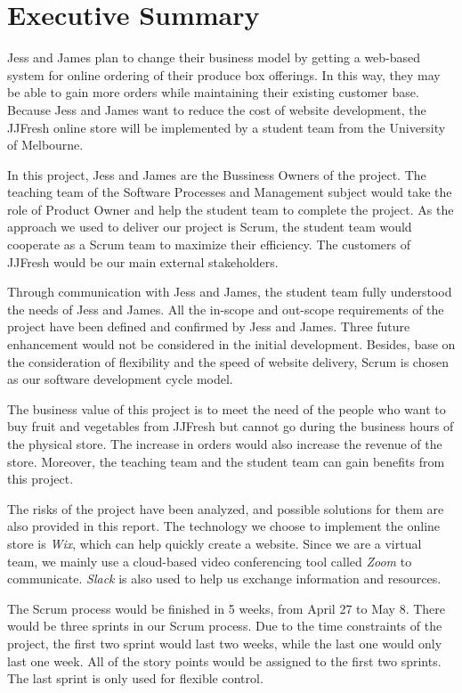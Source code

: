 \documentclass{report}
\begin{document}
\chapter*{Executive Summary}
   Jess and James plan to change their business model by getting a web-based system for online ordering of their produce box offerings. In this way, they may be able to gain more orders while maintaining their existing customer base. Because Jess and James want to reduce the cost of website development, the JJFresh online store will be implemented by a student team from the University of Melbourne.

   In this project, Jess and James are the Bussiness Owners of the project. The teaching team of the Software Processes and Management subject would take the role of Product Owner and help the student team to complete the project. As the approach we used to deliver our project is Scrum, the student team would cooperate as a Scrum team to maximize their efficiency. The customers of JJFresh would be our main external stakeholders.

   Through communication with Jess and James, the student team fully understood the needs of Jess and James. All the in-scope and out-scope requirements of the project have been defined and confirmed by Jess and James. Three future enhancement would not be considered in the initial development. Besides, base on the consideration of flexibility and the speed of website delivery, Scrum is chosen as our software development cycle model.

   The business value of this project is to meet the need of the people who want to buy fruit and vegetables from JJFresh but cannot go during the business hours of the physical store. The increase in orders would also increase the revenue of the store. Moreover, the teaching team and the student team can gain benefits from this project.

   The risks of the project have been analyzed, and possible solutions for them are also provided in this report. The technology we choose to implement the online store is \textit{Wix}, which can help quickly create a website. Since we are a virtual team, we mainly use a cloud-based video conferencing tool called \textit{Zoom} to communicate. \textit{Slack} is also used to help us exchange information and resources.

   The Scrum process would be finished in 5 weeks, from April 27 to May 8. There would be three sprints in our Scrum process. Due to the time constraints of the project, the first two sprint would last two weeks, while the last one would only last one week. All of the story points would be assigned to the first two sprints. The last sprint is only used for flexible control.
\end{document}
